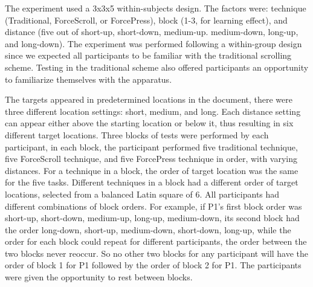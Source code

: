\documentclass{sigchi}
\begin{document}
The experiment used a 3x3x5 within-subjects design. The factors were: technique (Traditional, ForceScroll, or ForcePress), block (1-3, for learning effect), and distance (five out of short-up, short-down, medium-up. medium-down, long-up, and long-down). The experiment was performed following a within-group design since we expected all participants to be familiar with the traditional scrolling scheme. Testing in the traditional scheme also offered participants an opportunity to familiarize themselves with the apparatus.

The targets appeared in predetermined locations in the document, there were three different location settings: short, medium, and long. Each distance setting can appear either above the starting location or below it, thus resulting in six different target locations. Three blocks of tests were performed by each participant, in each block, the participant performed five traditional technique, five ForceScroll technique, and five ForcePress technique in order, with varying distances. For a technique in a block, the order of target location was the same for the five tasks. Different techniques in a block had a different order of target locations, selected from a balanced Latin square of 6. All participants had different combinations of block orders. For example, if P1's first block order was short-up, short-down, medium-up, long-up, medium-down, its second block had the order long-down, short-up, medium-down, short-down, long-up, while the order for each block could repeat for different participants, the order between the two blocks never reoccur. So no other two blocks for any participant will have the order of block 1 for P1 followed by the order of block 2 for P1. The participants were given the opportunity to rest between blocks.
\end{document}
